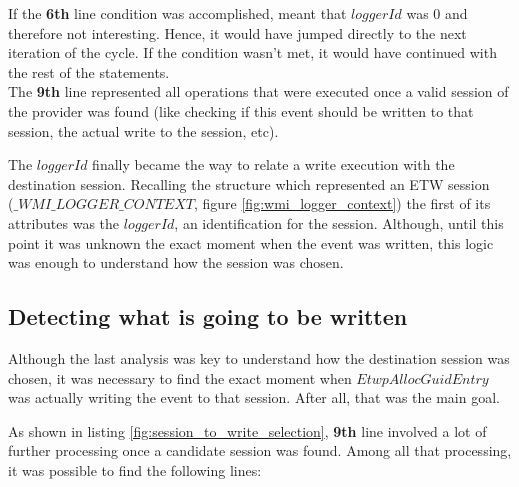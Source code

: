 If the {\bfseries 6th} line condition was accomplished, meant that $loggerId$ was 0 and therefore not interesting. Hence, it would have jumped directly to the next iteration of the cycle. If the condition wasn't met, it would have continued with the rest of the statements.\\
The {\bfseries 9th} line represented all operations that were executed once a valid session of the provider was found (like checking if this event should be written to that session, the actual write to the session, etc). 

The $loggerId$ finally became the way to relate a write execution with the destination session. Recalling the structure which represented an ETW session\\ ($\_WMI\_LOGGER\_CONTEXT$, figure \ref{fig:wmi_logger_context}) the first of its attributes was the $loggerId$, an identification for the session. Although, until this point it was unknown the exact moment when the event was written, this logic was enough to understand how the session was chosen. 






\subsection{\bfseries Detecting what is going to be written}
Although the last analysis was key to understand how the destination session was chosen, it was necessary to find the exact moment when $EtwpAllocGuidEntry$ was actually writing the event to that session. After all, that was the main goal. 


As shown in listing \ref{fig:session_to_write_selection}, {\bfseries 9th} line involved a lot of further processing once a candidate session was found. Among all that processing, it was possible to find the following lines: 

